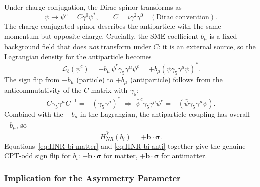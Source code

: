 \documentclass[main]{subfiles}
\begin{document}
Under charge conjugation, the Dirac spinor transforms as
\begin{equation}
  \psi \to \psi^c = C\gamma^0\psi^*, \qquad C = i\gamma^2\gamma^0
  \quad (\text{Dirac convention}).
\end{equation}
The charge-conjugated spinor describes the antiparticle with the same
momentum but opposite charge. Crucially, the SME coefficient $b_\mu$ is a
fixed background field that does \emph{not} transform under $C$: it is an
external source, so the Lagrangian density for the antiparticle becomes
\begin{equation}
  \mathcal L_b(\psi^c) = +b_\mu\,\bar\psi^c\gamma_5\gamma^\mu\psi^c
  = +b_\mu\left(\bar\psi\gamma_5\gamma^\mu\psi\right)^*.
\end{equation}
The sign flip from $-b_\mu$ (particle) to $+b_\mu$ (antiparticle) follows
from the anticommutativity of the $C$ matrix with $\gamma_5$:
\begin{equation}
  C\gamma_5\gamma^\mu C^{-1} = -(\gamma_5\gamma^\mu)^*
  \;\Longrightarrow\;
  \bar\psi^c\gamma_5\gamma^\mu\psi^c = -\left(\bar\psi\gamma_5\gamma^\mu\psi\right).
\end{equation}
Combined with the $-b_\mu$ in the Lagrangian, the antiparticle coupling has
overall $+b_\mu$, so
\begin{equation}
  H_{NR}^{\bar f}(b_i) = +\mathbf b\cdot\boldsymbol\sigma. \label{eq:HNR-bi-anti}
\end{equation}
Equations~\eqref{eq:HNR-bi-matter} and \eqref{eq:HNR-bi-anti} together give
the genuine CPT-odd sign flip for $b_i$: $-\mathbf b\cdot\boldsymbol\sigma$
for matter, $+\mathbf b\cdot\boldsymbol\sigma$ for antimatter.

\subsubsection{Implication for the Asymmetry Parameter}
\label{sec:bmu-asymmetry}
\end{document}
